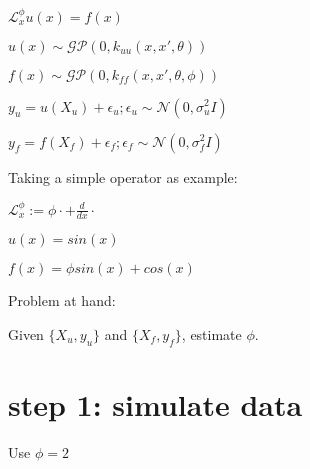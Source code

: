 \documentclass[letterpaper,10pt,english]{sphinxmanual}
\begin{document}
\(\mathcal{L}_x^\phi u(x) = f(x)\)

\(u(x) \sim \mathcal{GP}(0, k_{uu}(x,x',\theta))\)

\(f(x) \sim \mathcal{GP}(0, k_{ff}(x,x',\theta,\phi))\)

\(y_u = u(X_u) + \epsilon_u; \epsilon_u \sim \mathcal{N}(0, \sigma_u^2I)\)

\(y_f = f(X_f) + \epsilon_f; \epsilon_f \sim \mathcal{N}(0, \sigma_f^2I)\)

Taking a simple operator as example:

\(\mathcal{L}_x^\phi := \phi \cdot + \frac{d}{dx}\cdot\)

\(u(x) = sin(x)\)

\(f(x) = \phi sin(x) + cos(x)\)

Problem at hand:

Given \(\{X_u, y_u\}\) and \(\{X_f, y_f\}\), estimate
\(\phi\).


\section{step 1: simulate data}
\label{\detokenize{notebooks/par_est/par_est:step-1-simulate-data}}
Use \(\phi = 2\)

%
\begin{sphinxVerbatim}[commandchars=\\\{\}]
   
   
   
   
\end{sphinxVerbatim}

%
\begin{sphinxVerbatim}[commandchars=\\\{\}]
  
  
   
    
\end{sphinxVerbatim}
\end{document}
